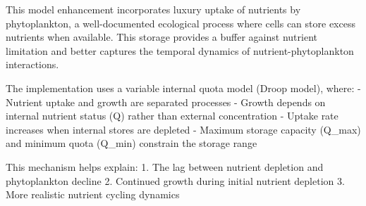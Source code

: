 This model enhancement incorporates luxury uptake of nutrients by phytoplankton, a well-documented ecological process where cells can store excess nutrients when available. This storage provides a buffer against nutrient limitation and better captures the temporal dynamics of nutrient-phytoplankton interactions.

The implementation uses a variable internal quota model (Droop model), where:
- Nutrient uptake and growth are separated processes
- Growth depends on internal nutrient status (Q) rather than external concentration
- Uptake rate increases when internal stores are depleted
- Maximum storage capacity (Q_max) and minimum quota (Q_min) constrain the storage range

This mechanism helps explain:
1. The lag between nutrient depletion and phytoplankton decline
2. Continued growth during initial nutrient depletion
3. More realistic nutrient cycling dynamics

